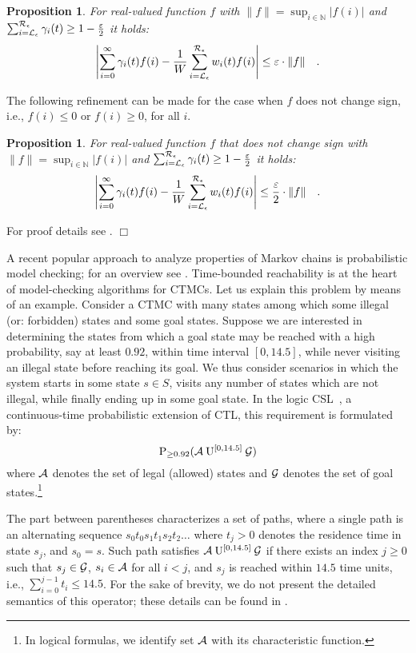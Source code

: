 \documentclass[times, 10pt,twocolumn]{article}
\newtheorem{prop}[theorem]{Proposition}
\newenvironment{proof}{\trivlist \item[\hskip \labelsep{\bf Proof}]}{\hfill\hbox{$\Box$}\endtrivlist}
\begin{document}
	\begin{prop}
		\cite{FoxG_ACM88} For real-valued function $f$ with $\|f\| = \sup_{i \in \mathbb{N}}|f(i)|$ and $\sum_{i=\mathcal{L}_{\epsilon}}^{\mathcal{R}_{\epsilon}} \gamma_{i}(t) \geq 1 - \frac{\varepsilon}{2}$ it holds:
		{\small
		\[
			\left| \sum_{i=0}^{\infty} \gamma_{i}(t) f(i) - \frac{1}{W}\sum_{i = \mathcal{L}_{\epsilon}}^{\mathcal{R}_{\epsilon}} w_{i}(t) f(i) \right| \leq \varepsilon \cdot \|f\| \quad .
		\]
		}
	\end{prop}
	The following refinement can be made for the case when $f$ does not change sign, i.e., $f(i) \leq 0$ or $f(i) \geq 0$, for all $i$.
	\begin{prop}
		For real-valued function $f$ that does not change sign with $\|f\| = \sup_{i \in \mathbb{N}}|f(i)|$ and $\sum_{i=\mathcal{L}_{\epsilon}}^{\mathcal{R}_{\epsilon}} \gamma_{i}(t) \geq 1 - \frac{\varepsilon}{2}$ it holds:
		{\small
		\[
			\left| \sum_{i=0}^{\infty} \gamma_{i}(t) f(i) - \frac{1}{W}\sum_{i = \mathcal{L}_{\epsilon}}^{\mathcal{R}_{\epsilon}} w_{i}(t) f(i) \right| \leq \frac{\varepsilon}{2} \cdot \|f\| \quad .
		\]
		}
		\label{pr:fg_imp}
	\end{prop}
	\begin{proof}
		For proof details see \cite{KatoenZ_TR05}.
	\end{proof}

{}

		A recent popular approach to analyze properties of Markov chains is probabilistic model checking; for an overview see \cite{Kwiatkowska_SLCS03}.  Time-bounded reachability is at the heart of model-checking algorithms for CTMCs.  Let us explain this problem by means of an example. Consider a CTMC with many states among which some illegal (or: forbidden) states and some goal states.  Suppose we are interested in determining the states from which a goal state may be reached with a high probability, say at least $0.92$, within time interval $[0,14.5]$, while never visiting an illegal state before reaching its goal. We thus consider scenarios in which the system starts in some state $s \in S$, visits any number of states which are not illegal, while finally ending up in some goal state.  In the logic CSL~\cite{AzizSSB_ACMTCL00,BaierHHK_TSE03}, a continuous-time probabilistic extension of CTL,  this requirement is formulated by:
		\[
			\mathrm{P}_{\geq 0.92}(\mathcal{A} \: \mathrm{U}^{[0,14.5]} \: \mathcal{G})
		\]
		where $\mathcal{A}$ denotes the set of legal (allowed) states and $\mathcal{G}$ denotes the set of goal states.\footnote{In logical formulas, we identify set $\mathcal{A}$ with its characteristic function.}
		
		The part between parentheses characterizes a set of paths, where a single path is an alternating sequence $s_{0}t_{0}s_{1}t_{1}s_{2}t_{2}\ldots$ where $t_{j} > 0$ denotes the residence time in state $s_{j}$, and $s_{0} = s$.  Such path satisfies $\mathcal{A} \: \mathrm{U}^{[0,14.5]} \: \mathcal{G}$ if there exists an index $j \geq 0$ such that $s_{j} \in \mathcal{G}$, $s_i \in \mathcal{A}$ for all $i < j$, and $s_{j}$ is reached within $14.5$ time units, i.e., $\sum_{i=0}^{j{-}1}t_{i} \leq 14.5$.  For the sake of brevity, we do not present the detailed semantics of this operator; these details can be found in \cite{AzizSSB_ACMTCL00,BaierHHK_TSE03}.
	
\end{document}
